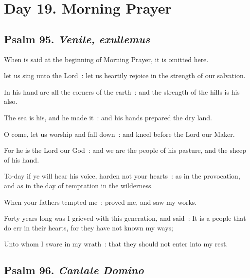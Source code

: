\section*{Day 19. Morning Prayer}

\subsection{Psalm 95. \textit{Venite, exultemus}}

\begin{rubric}
	When  is said at the beginning of Morning Prayer, it is omitted here.
\end{rubric}

 let us sing unto the Lord~: let us heartily rejoice in the strength of our salvation.\par
{}
In his hand are all the corners of the earth~: and the strength of the hills is his also.\par
{}The sea is his, and he made it~: and his hands prepared the dry land.\par
{}O come, let us worship and fall down~: and kneel before the Lord our Maker.\par
{}For he is the Lord our God~: and we are the people of his pasture, and the sheep of his hand.\par
{}To-day if ye will hear his voice, harden not your hearts~: as in the provocation, and as in the day of temptation in the wilderness.\par
{}When your fathers tempted me~: proved me, and saw my works.\par
{}Forty years long was I grieved with this generation, and said~: It is a people that do err in their hearts, for they have not known my ways;\par
{}Unto whom I sware in my wrath~: that they should not enter into my rest.\par

\subsection{Psalm 96. \textit{Cantate Domino}}

